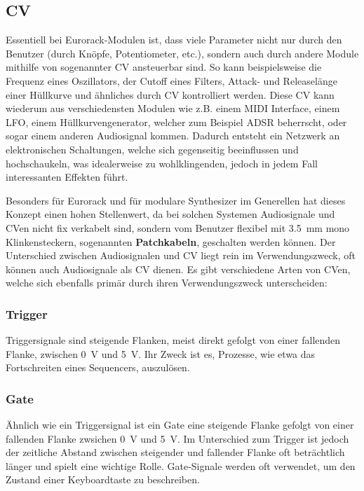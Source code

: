 \subsection{\acf{CV} \label{CV}}
\label{sec:org241e9a5}
Essentiell bei Eurorack-Modulen ist, dass viele Parameter nicht nur durch den Benutzer (durch Knöpfe, Potentiometer, etc.), sondern auch durch andere Module mithilfe von sogenannter \acl{CV} ansteuerbar sind. So kann beispielsweise die Frequenz eines Oszillators, der Cutoff eines Filters, Attack- und Releaselänge einer Hüllkurve und ähnliches durch \acl{CV} kontrolliert werden. Diese \acl{CV} kann wiederum aus verschiedensten Modulen wie z.B. einem MIDI Interface, einem \ac{LFO}, einem Hüllkurvengenerator, welcher zum Beispiel \ac{ADSR} beherrscht, oder sogar einem anderen Audiosignal kommen. Dadurch entsteht ein Netzwerk an elektronischen Schaltungen, welche sich gegenseitig beeinflussen und hochschaukeln, was idealerweise zu wohlklingenden, jedoch in jedem Fall interessanten Effekten führt.

Besonders für Eurorack und für modulare Synthesizer im Generellen hat dieses Konzept einen hohen Stellenwert, da bei solchen Systemen Audiosignale und \acl{CV}en nicht fix verkabelt sind, sondern vom Benutzer flexibel mit \SI{3.5}{\milli\meter} mono Klinkensteckern, sogenannten \textbf{Patchkabeln}, geschalten werden können. Der Unterschied zwischen Audiosignalen und \acl{CV} liegt rein im Verwendungszweck, oft können auch Audiosignale als \acl{CV} dienen. Es gibt verschiedene Arten von \acl{CV}en, welche sich ebenfalls primär durch ihren Verwendungszweck unterscheiden:

\subsubsection{Trigger}
\label{sec:org31fb120}
Triggersignale sind steigende Flanken, meist direkt gefolgt von einer fallenden Flanke, zwischen \SI{0}{\volt} und \SI{5}{\volt}. Ihr Zweck ist es, Prozesse, wie etwa das Fortschreiten eines Sequencers, auszulösen.

\subsubsection{Gate}
\label{sec:orgb6b5394}
Ähnlich wie ein Triggersignal ist ein Gate eine steigende Flanke gefolgt von einer fallenden Flanke zwsichen \SI{0}{\volt} und \SI{5}{\volt}. Im Unterschied zum Trigger ist jedoch der zeitliche Abstand zwischen steigender und fallender Flanke oft beträchtlich länger und spielt eine wichtige Rolle. Gate-Signale werden oft verwendet, um den Zustand einer Keyboardtaste zu beschreiben.

